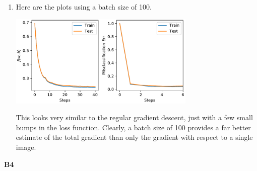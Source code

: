 \documentclass{article}
\begin{document}
\begin{enumerate}
        \item Here are the plots using a batch size of 100.
        \begin{center}
                \includegraphics[width=0.7\textwidth]{code/A6d.pdf}
        \end{center}
        This looks very similar to the regular gradient descent, just with a few small bumps in the loss function.
        Clearly, a batch size of 100 provides a far better estimate of the total gradient than only the gradient with respect to a single image.
\end{enumerate}

\newpage

\textbf{B4}
\end{document}
